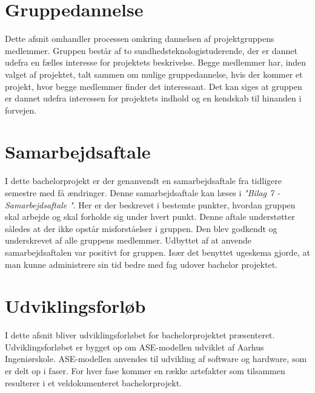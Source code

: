 \chapter{Gruppedannelse}
Dette afsnit omhandler processen omkring dannelsen af projektgruppens medlemmer. Gruppen består af to sundhedsteknologistuderende, der er dannet udefra en fælles interesse for projektets beskrivelse. Begge medlemmer har, inden valget af projektet, talt sammen om mulige gruppedannelse, hvis der kommer et projekt, hvor begge medlemmer finder det interessant. Det kan siges at gruppen er dannet udefra interessen for projektets indhold og en kendskab til hinanden i forvejen.     



\chapter{Samarbejdsaftale}
I dette bachelorprojekt er der genanvendt en samarbejdsaftale fra tidligere semestre med få ændringer. Denne samarbejdsaftale kan læses i \textit{"Bilag 7 - Samarbejdsaftale "}. Her er der beskrevet i bestemte punkter, hvordan gruppen skal arbejde og skal forholde sig under hvert punkt. Denne aftale understøtter således at der ikke opstår misforståelser i gruppen. Den blev godkendt og underskrevet af alle gruppens medlemmer. Udbyttet af at anvende samarbejdsaftalen var positivt for gruppen. Især det benyttet ugeskema gjorde, at man kunne administrere sin tid bedre med fag udover bachelor projektet. 



\chapter{Udviklingsforløb}

I dette afsnit bliver udviklingsforløbet for bachelorprojektet præsenteret. Udviklingsforløbet er bygget op om ASE-modellen\cite{IngeniorhojskolenAarhusUniversiteta} udviklet af Aarhus Ingeniørskole. ASE-modellen anvendes til udvikling af software og hardware, som er delt op i faser. For hver fase kommer en række artefakter som tilsammen resulterer i et veldokumenteret bachelorprojekt. 


